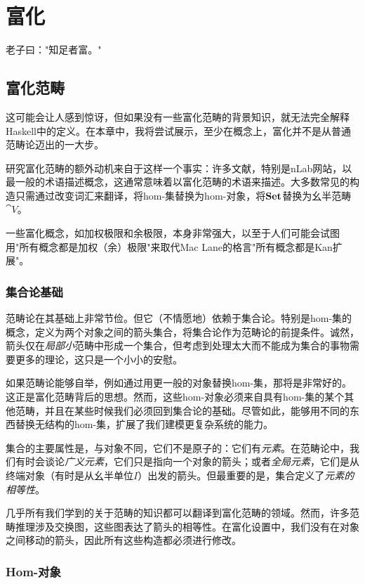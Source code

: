 \documentclass[DaoFP]{subfiles}
\begin{document}
\setcounter{chapter}{20}

\chapter{富化}

老子曰："知足者富。"

\section{富化范畴}

这可能会让人感到惊讶，但如果没有一些富化范畴的背景知识，就无法完全解释Haskell中的定义。在本章中，我将尝试展示，至少在概念上，富化并不是从普通范畴论迈出的一大步。

研究富化范畴的额外动机来自于这样一个事实：许多文献，特别是nLab网站，以最一般的术语描述概念，这通常意味着以富化范畴的术语来描述。大多数常见的构造只需通过改变词汇来翻译，将hom-集替换为hom-对象，将$\mathbf{Set}$替换为幺半范畴$\cat V$。

一些富化概念，如加权极限和余极限，本身非常强大，以至于人们可能会试图用"所有概念都是加权（余）极限"来取代Mac Lane的格言"所有概念都是Kan扩展"。

\subsection{集合论基础}

范畴论在其基础上非常节俭。但它（不情愿地）依赖于集合论。特别是hom-集的概念，定义为两个对象之间的箭头集合，将集合论作为范畴论的前提条件。诚然，箭头仅在\emph{局部小}范畴中形成一个集合，但考虑到处理太大而不能成为集合的事物需要更多的理论，这只是一个小小的安慰。

如果范畴论能够自举，例如通过用更一般的对象替换hom-集，那将是非常好的。这正是富化范畴背后的思想。然而，这些hom-对象必须来自具有hom-集的某个其他范畴，并且在某些时候我们必须回到集合论的基础。尽管如此，能够用不同的东西替换无结构的hom-集，扩展了我们建模更复杂系统的能力。

集合的主要属性是，与对象不同，它们不是原子的：它们有\emph{元素}。在范畴论中，我们有时会谈论\emph{广义元素}，它们只是指向一个对象的箭头；或者\emph{全局元素}，它们是从终端对象（有时是从幺半单位$I$）出发的箭头。但最重要的是，集合定义了\emph{元素的相等性}。

几乎所有我们学到的关于范畴的知识都可以翻译到富化范畴的领域。然而，许多范畴推理涉及交换图，这些图表达了箭头的相等性。在富化设置中，我们没有在对象之间移动的箭头，因此所有这些构造都必须进行修改。

\subsection{Hom-对象}
\end{document}
